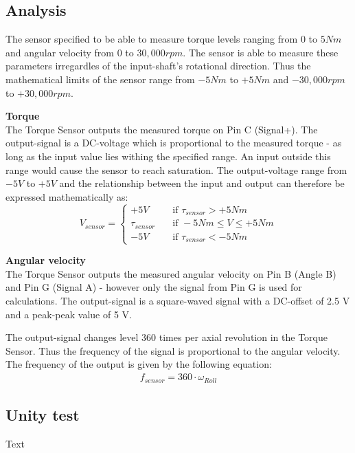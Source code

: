 \subsection{Analysis}
The sensor specified to be able to measure torque levels ranging from $0$ to $5 Nm$ and angular velocity from $0$ to $30,000 rpm$. The sensor is able to measure these parameters irregardles of the input-shaft's rotational direction. Thus the mathematical limits of the sensor range from $-5 Nm$ to $+5 Nm$ and $-30,000 rpm$ to $+30,000 rpm$.

\textbf{Torque}\\
The Torque Sensor outputs the measured torque on Pin C (Signal+). The output-signal is a DC-voltage which is proportional to the measured torque - as long as the input value lies withing the specified range. An input outside this range would cause the sensor to reach saturation. The output-voltage range from $-5 V$ to $+5 V$ and the relationship between the input and output can therefore be expressed mathematically as:
\begin{equation}
	V_{sensor} = 
	\begin{cases}
		+5V				& \quad \text{if } \tau_{sensor} > +5 Nm\\
		\tau_{sensor}   & \quad \text{if } -5 Nm \leq V \leq +5 Nm\\
		-5V				& \quad \text{if } \tau_{sensor} < -5 Nm
	\end{cases}
\end{equation}

\textbf{Angular velocity}\\
The Torque Sensor outputs the measured angular velocity on Pin B (Angle B) and Pin G (Signal A) - however only the signal from Pin G is used for calculations. The output-signal is a square-waved signal with a DC-offset of 2.5 V and a peak-peak value of 5 V.

The output-signal changes level 360 times per axial revolution in the Torque Sensor. Thus the frequency of the signal is proportional to the angular velocity. The frequency of the output is given by the following equation:
\begin{equation}
	\begin{split}
		f_{sensor} = 360 \cdot \omega_{Roll}
	\end{split}
\end{equation}

\subsection{Unity test}
Text